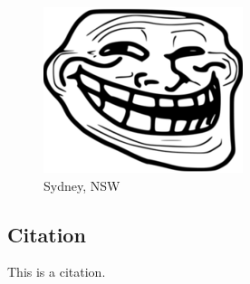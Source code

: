 \documentclass{article}
\begin{document}
\begin{figure}[htbp]
    \center
    \includegraphics[scale=0.06]{shitpost.png}
    \caption{Sydney, NSW}
\end{figure}

\subsection{Citation}

This is a citation\cite{ctan}.

\newpage





\end{document}
